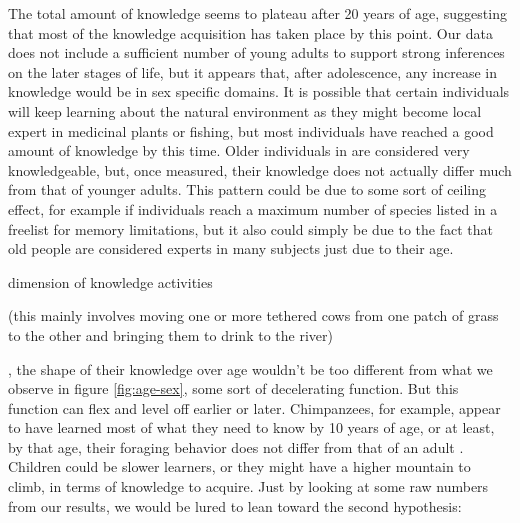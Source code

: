 The total amount of knowledge seems to plateau after 20 years of age, suggesting that most of the knowledge acquisition has taken place by this point. Our data does not include a sufficient number of young adults to support strong inferences on the later stages of life, but it appears that, after adolescence, any increase in knowledge would be in sex specific domains. It is possible that certain individuals will keep learning about the natural environment as they might become local expert in medicinal plants or fishing, but most individuals have reached a good amount of knowledge by this time. Older individuals in \cite{Koster2016WisdomElders} are considered very knowledgeable, but, once measured, their knowledge does not actually differ much from that of younger adults. This pattern could be due to some sort of ceiling effect, for example if individuals reach a maximum number of species listed in a freelist for memory limitations, but it also could simply be due to the fact that old people are considered experts in many subjects just due to their age. 



 dimension of knowledge activities

(this mainly involves moving one or more tethered cows from one patch of grass to the other and bringing them to drink to the river)

, the shape of their knowledge over age wouldn't be too different from what we observe in figure \ref{fig:age-sex}, some sort of decelerating function.
But this function can flex and level off earlier or later.
Chimpanzees, for example, appear to have learned most of what they need to know by 10 years of age, or at least, by that age, their foraging behavior does not differ from that of an adult \citep{BrayTheSchweinfurthii, Lonsdorf2021WildWeaning}. Children could be slower learners, or they might have a higher mountain to climb, in terms of knowledge to acquire. Just by looking at some raw numbers from our results, we would be lured to lean toward the second hypothesis: 

